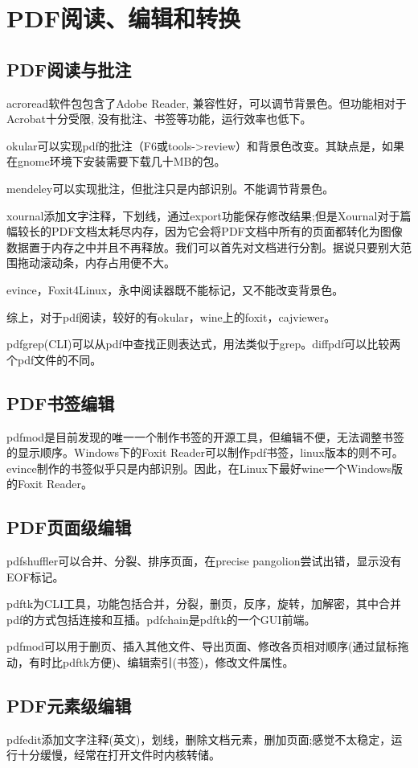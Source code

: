 \section{PDF阅读、编辑和转换}

\subsection{PDF阅读与批注}
acroread软件包包含了Adobe Reader, 兼容性好，可以调节背景色。但功能相对于Acrobat十分受限, 没有批注、书签等功能，运行效率也低下。

okular可以实现pdf的批注（F6或tools->review）和背景色改变。其缺点是，如果在gnome环境下安装需要下载几十MB的包。

mendeley可以实现批注，但批注只是内部识别。不能调节背景色。

xournal添加文字注释，下划线，通过export功能保存修改结果;但是Xournal对于篇幅较长的PDF文档太耗尽内存，因为它会将PDF文档中所有的页面都转化为图像数据置于内存之中并且不再释放。我们可以首先对文档进行分割。据说只要别大范围拖动滚动条，内存占用便不大。

evince，Foxit4Linux，永中阅读器既不能标记，又不能改变背景色。

综上，对于pdf阅读，较好的有okular，wine上的foxit，cajviewer。

pdfgrep(CLI)可以从pdf中查找正则表达式，用法类似于grep。diffpdf可以比较两个pdf文件的不同。

\subsection{PDF书签编辑}
pdfmod是目前发现的唯一一个制作书签的开源工具，但编辑不便，无法调整书签的显示顺序。Windows下的Foxit Reader可以制作pdf书签，linux版本的则不可。evince制作的书签似乎只是内部识别。因此，在Linux下最好wine一个Windows版的Foxit Reader。

\subsection{PDF页面级编辑}

pdfshuffler可以合并、分裂、排序页面，在precise pangolion尝试出错，显示没有EOF标记。

pdftk为CLI工具，功能包括合并，分裂，删页，反序，旋转，加解密，其中合并pdf的方式包括连接和互插。pdfchain是pdftk的一个GUI前端。

pdfmod可以用于删页、插入其他文件、导出页面、修改各页相对顺序(通过鼠标拖动，有时比pdftk方便)、编辑索引(书签)，修改文件属性。

\subsection{PDF元素级编辑}
pdfedit添加文字注释(英文)，划线，删除文档元素，删加页面;感觉不太稳定，运行十分缓慢，经常在打开文件时内核转储。

